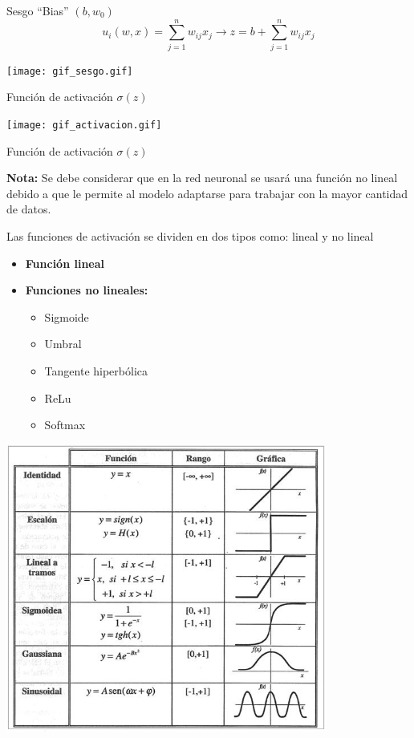 \documentclass[
  ignorenonframetext,
]{beamer}
\begin{document}
\begin{frame}
\begin{block}{Sesgo ``Bias'' \((b, w_{0})\)}
\[u_{i}(w,x)=\sum_{j=1}^{n}w_{ij}x_{j} \longrightarrow z=b+\sum_{j=1}^{n}w_{ij}x_{j} \]

\texttt{[image: gif\_sesgo.gif]}

\end{block}

\begin{block}{Función de activación \(\sigma(z)\)}

\texttt{[image: gif\_activacion.gif]}

\end{block}

\begin{block}{Función de activación \(\sigma(z)\)}

\textbf{Nota:} Se debe considerar que en la red neuronal se usará una
función no lineal debido a que le permite al modelo adaptarse para
trabajar con la mayor cantidad de datos.

Las funciones de activación se dividen en dos tipos como: lineal y no
lineal

\begin{itemize}
\item
  \textbf{Función lineal}
\item
  \textbf{Funciones no lineales:}

  \begin{itemize}
  \item
    Sigmoide
  \item
    Umbral
  \item
    Tangente hiperbólica
  \item
    ReLu
  \item
    Softmax
  \end{itemize}
\end{itemize}

\includegraphics[width=4.16667in,height=\textheight]{funciones.jpg}

\end{block}

\end{frame}
\end{document}
